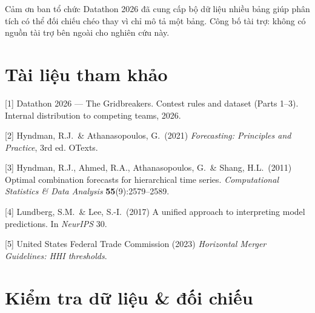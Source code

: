 \documentclass{article}
\begin{document}
\begin{ack}
Cảm ơn ban tổ chức Datathon 2026 đã cung cấp bộ dữ liệu nhiều bảng giúp phân tích có thể đối chiếu chéo thay vì chỉ mô tả một bảng. Công bố tài trợ: không có nguồn tài trợ bên ngoài cho nghiên cứu này.
\end{ack}

\section*{Tài liệu tham khảo}
\small
[1] Datathon 2026 --- The Gridbreakers. Contest rules and dataset (Parts 1--3). Internal distribution to competing teams, 2026.

[2] Hyndman, R.J.\ \& Athanasopoulos, G.\ (2021) \emph{Forecasting: Principles and Practice}, 3rd ed. OTexts.

[3] Hyndman, R.J., Ahmed, R.A., Athanasopoulos, G.\ \& Shang, H.L.\ (2011) Optimal combination forecasts for hierarchical time series. \emph{Computational Statistics \& Data Analysis} \textbf{55}(9):2579--2589.

[4] Lundberg, S.M.\ \& Lee, S.-I.\ (2017) A unified approach to interpreting model predictions. In \emph{NeurIPS} 30.

[5] United States Federal Trade Commission (2023) \emph{Horizontal Merger Guidelines: HHI thresholds}.

\appendix

\section{Kiểm tra dữ liệu \& đối chiếu}
\label{app:audit}
\end{document}
